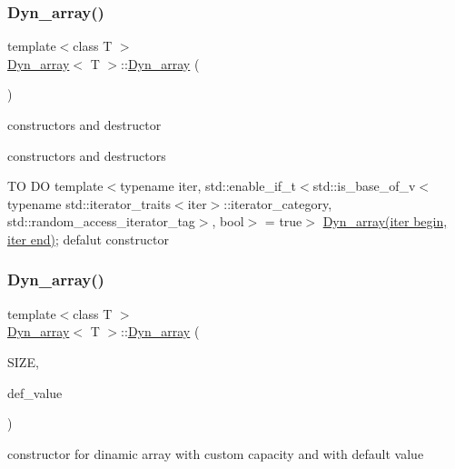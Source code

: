 \subsubsection{\texorpdfstring{Dyn\+\_\+array()}{Dyn\_array()}\hspace{0.1cm}{\footnotesize\ttfamily [1/6]}}
{\footnotesize\ttfamily template$<$class T $>$ \\
\hyperlink{classDyn__array}{Dyn\+\_\+array}$<$ T $>$\+::\hyperlink{classDyn__array}{Dyn\+\_\+array} (\begin{DoxyParamCaption}{ }\end{DoxyParamCaption})}



constructors and destructor 

constructors and destructors

TO DO template$<$typename iter, std\+::enable\+\_\+if\+\_\+t$<$std\+::is\+\_\+base\+\_\+of\+\_\+v$<$typename std\+::iterator\+\_\+traits$<$iter$>$\+::iterator\+\_\+category, std\+::random\+\_\+access\+\_\+iterator\+\_\+tag$>$, bool$>$ = true$>$ \hyperlink{classDyn__array}{Dyn\+\_\+array(iter begin, iter end)}; defalut constructor \mbox{\label{classDyn__array_a25117136ea5c69b0bee57d5c12b481b9}} 
\subsubsection{\texorpdfstring{Dyn\+\_\+array()}{Dyn\_array()}\hspace{0.1cm}{\footnotesize\ttfamily [2/6]}}
{\footnotesize\ttfamily template$<$class T $>$ \\
\hyperlink{classDyn__array}{Dyn\+\_\+array}$<$ T $>$\+::\hyperlink{classDyn__array}{Dyn\+\_\+array} (\begin{DoxyParamCaption}\item[{const size\+\_\+t}]{S\+I\+ZE,  }\item[{const T}]{def\+\_\+value }\end{DoxyParamCaption})}



constructor for dinamic array with custom capacity and with default value 


